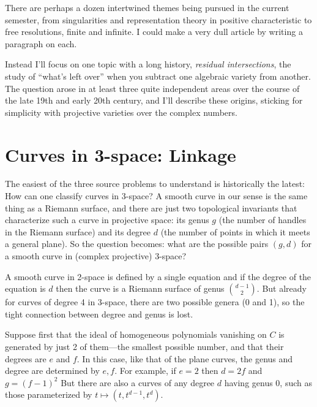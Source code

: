 \documentclass[11pt, oneside]{article}   	%
\begin{document}
There are perhaps a dozen intertwined themes being pursued in the current semester, from singularities and representation theory in positive characteristic to free resolutions, finite and infinite. I could make a very dull article by writing a paragraph on each. 

Instead I'll focus on one topic with a long history, \emph{residual intersections}, the study of ``what's left over'' when you subtract one algebraic variety from another. The question arose in at least three quite independent areas over the course of the late 19th and early 20th century, and I'll describe these origins, sticking for simplicity with projective varieties over the complex numbers.

\section{Curves in 3-space: Linkage} The easiest of the three source problems to understand is historically the latest: How can one classify curves in 3-space? A smooth curve in our sense is the same thing as a Riemann surface, and there are just two topological invariants that characterize such a curve in projective space: its genus $g$ (the number of handles in the Riemann surface) and its degree $d$ (the number of points in which it meets a general plane). So the question becomes: what are the possible pairs $(g,d)$ for a smooth curve in (complex projective) 3-space?

A  smooth curve in 2-space is defined by a single equation and if the degree of the equation is $d$ then the curve is a Riemann surface of genus $d-1\choose 2$.
But already for curves of degree 4 in 3-space, there are two possible genera (0 and 1), so the tight connection between degree and genus is lost.

Suppose first that the ideal of homogeneous polynomials vanishing on $C$ is generated by just 2 of them---the smallest possible number, and that their degrees are $e$ and $f$. In this case,
like that of the plane curves, the genus and degree are determined by $e,f$. For example,
if $e=2$ then $d = 2f$ and $g = (f-1)^{2}$ But there are also a curves of any degree $d$ having genus 0, such as those parameterized by $t \mapsto (t, t^{d-1}, t^{d})$. 
\end{document}
